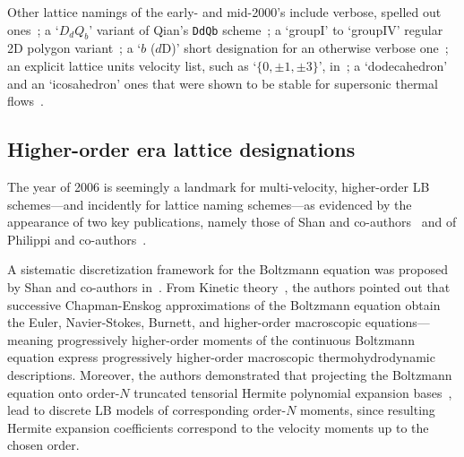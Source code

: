     Other     lattice     namings     of     the     early-     and     mid-2000's     include     verbose,     spelled      out
    ones~\cite{2001-dHumieresD+LallemandP-PhysRevE,  2005-LuXY-IntJModPhysC};  a  `$D_dQ_b$'  variant  of  Qian's  \texttt{DdQb}
    scheme~\cite{2003-NourgalievRR+JosephD-IntJMulFlow};     a     `groupI'     to     `groupIV'     regular     2D      polygon
    variant~\cite{2003-WatariM+TsutaharaM-PhysRevE, 2007-WatariM-PhysA}; a `$b$  ($d$D)'  short  designation  for  an  otherwise
    verbose one~\cite{2006-ChikatamarlaSS+KarlinIL-PhysRevLett}; an explicit lattice units velocity list, such as `$\{0, \pm  1,
    \pm 3\}$', in~\cite{2006-ChikatamarlaSS+KarlinIV-PhysRevLett}; a `dodecahedron' and an `icosahedron' ones that were shown to
    be stable for supersonic thermal flows~\cite{2006-WatariM+TsutaharaM-PhysA, 2007-WatariM-PhysA}.
 
    \subsection{Higher-order era lattice designations}

    The year of 2006 is seemingly a landmark for multi-velocity, higher-order LB schemes---and  incidently  for  lattice  naming
    schemes---as   evidenced   by   the   appearance   of    two    key    publications,    namely    those    of    Shan    and
    co-authors~\cite{2006-ShanX+ChenH-JFluidMech} and of Philippi and co-authors~\cite{2006-PhilippiPC+SurmasR-PhysRevE}.

    A  sistematic  discretization   framework   for   the   Boltzmann   equation   was   proposed   by   Shan   and   co-authors
    in~\cite{2006-ShanX+ChenH-JFluidMech}.  From  Kinetic  theory~\cite{2011-HarrisS-Dover,   2003-LiboffRL-bookSpringer},   the
    authors pointed out that successive Chapman-Enskog approximations of the Boltzmann equation obtain the Euler, Navier-Stokes,
    Burnett, and higher-order macroscopic equations---meaning progressively higher-order moments  of  the  continuous  Boltzmann
    equation express progressively higher-order macroscopic thermohydrodynamic descriptions. Moreover, the authors  demonstrated
    that   projecting   the   Boltzmann   equation   onto   order-$N$   truncated   tensorial   Hermite   polynomial   expansion
    bases~\cite{1949-GradH-CommPureApplMath}, lead to discrete LB models of corresponding  order-$N$  moments,  since  resulting
    Hermite expansion coefficients correspond to the velocity moments up to the chosen order.

